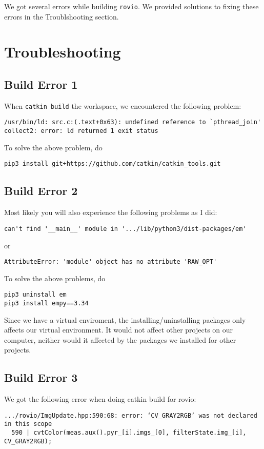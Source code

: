 \documentclass[11pt, oneside]{article}   	%
\begin{document}
We got several errors while building \verb+rovio+. We provided
solutions to fixing these errors in the Troublshooting section.

\section{Troubleshooting}
\subsection{Build Error 1}
When \verb+catkin build+ the workspace, we encountered the following
problem:
\begin{verbatim}
/usr/bin/ld: src.c:(.text+0x63): undefined reference to `pthread_join'
collect2: error: ld returned 1 exit status
\end{verbatim}
To solve the above problem, do
\begin{verbatim}
pip3 install git+https://github.com/catkin/catkin_tools.git
\end{verbatim}

\subsection{Build Error 2}
Most likely you will also experience the following problems as I did:
\begin{verbatim}
can't find '__main__' module in '.../lib/python3/dist-packages/em'
\end{verbatim}

or
\begin{verbatim}
AttributeError: 'module' object has no attribute 'RAW_OPT'
\end{verbatim}

To solve the above problems, do
\begin{verbatim}
pip3 uninstall em
pip3 install empy==3.34
\end{verbatim}

Since we have a virtual enviroment, the installing/uninstalling
packages only affects our virtual environment. It would not affect
other projects on our computer, neither would it affected by the
packages we installed for other projects.

\subsection{Build Error 3}
We got the following error when doing catkin build for rovio:
\begin{verbatim}
.../rovio/ImgUpdate.hpp:590:68: error: ‘CV_GRAY2RGB’ was not declared in this scope
  590 | cvtColor(meas.aux().pyr_[i].imgs_[0], filterState.img_[i], CV_GRAY2RGB);
\end{verbatim}
\end{document}
